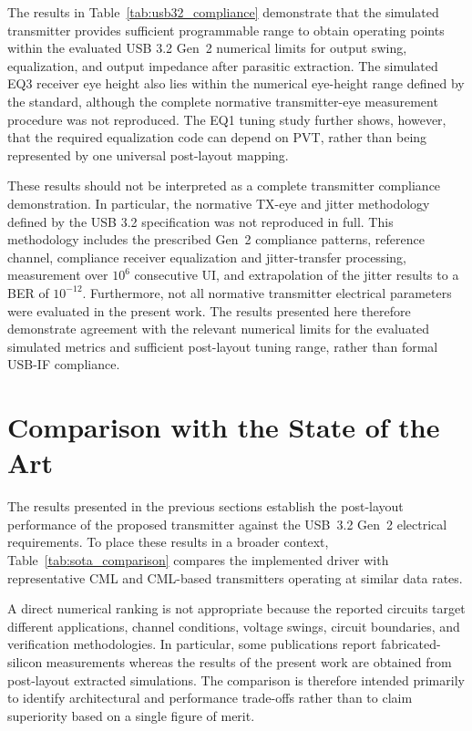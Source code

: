 \vspace*{10px}

The results in Table~\ref{tab:usb32_compliance} demonstrate that the simulated transmitter provides sufficient programmable range to obtain operating points within the evaluated \ac{USB} 3.2 Gen~2 numerical limits for output swing, equalization, and output impedance after parasitic extraction. The simulated EQ3 receiver eye height also lies within the numerical eye-height range defined by the standard, although the complete normative transmitter-eye measurement procedure was not reproduced. The EQ1 tuning study further shows, however, that the required equalization code can depend on \ac{PVT}, rather than being represented by one universal post-layout mapping.

These results should not be interpreted as a complete transmitter compliance demonstration. In particular, the normative \ac{TX}-eye and jitter methodology defined by the \ac{USB} 3.2 specification was not reproduced in full. This methodology includes the prescribed Gen~2 compliance patterns, reference channel, compliance receiver equalization and jitter-transfer processing, measurement over $10^6$ consecutive \ac{UI}, and extrapolation of the jitter results to a BER of $10^{-12}$. Furthermore, not all normative transmitter electrical parameters were evaluated in the present work. The results presented here therefore demonstrate agreement with the relevant numerical limits for the evaluated simulated metrics and sufficient post-layout tuning range, rather than formal \ac{USB-IF} compliance.

\section{Comparison with the State of the Art}
\label{sec:sota_comparison}

The results presented in the previous sections establish the post-layout performance of the proposed transmitter against the \ac{USB}~3.2 Gen~2 electrical requirements. To place these results in a broader context, Table~\ref{tab:sota_comparison} compares the implemented driver with representative \ac{CML} and \ac{CML}-based transmitters operating at similar data rates.

A direct numerical ranking is not appropriate because the reported circuits target different applications, channel conditions, voltage swings, circuit boundaries, and verification methodologies. In particular, some publications report fabricated-silicon measurements whereas the results of the present work are obtained from post-layout extracted simulations. The comparison is therefore intended primarily to identify architectural and performance trade-offs rather than to claim superiority based on a single figure of merit.

